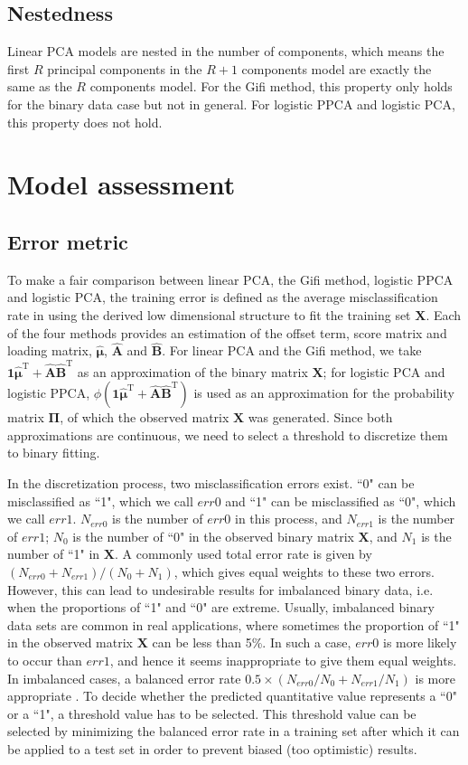 \subsection{Nestedness}
Linear PCA models are nested in the number of components, which means the first $R$ principal components in the $R+1$ components model are exactly the same as the $R$ components model. For the Gifi method, this property only holds for the binary data case but not in general. For logistic PPCA and logistic PCA, this property does not hold.

\section{Model assessment}

\subsection{Error metric}
To make a fair comparison between linear PCA, the Gifi method, logistic PPCA and logistic PCA, the training error is defined as the average misclassification rate in using the derived low dimensional structure to fit the training set $\mathbf{X}$. Each of the four methods provides an estimation of the offset term, score matrix and loading matrix, $\bm{\hat{\mu}}$, $\mathbf{\hat{A}}$ and $\mathbf{\hat{B}}$. For linear PCA and the Gifi method, we take $\mathbf{1}\bm{\hat{\mu}}^{\text{T}} + \mathbf{\hat{A}}\mathbf{\hat{B}}^{\text{T}}$ as an approximation of the binary matrix $\mathbf{X}$; for logistic PCA and logistic PPCA, $\phi(\mathbf{1}\bm{\hat{\mu}}^{\text{T}} + \mathbf{\hat{A}}\mathbf{\hat{B}}^{\text{T}})$ is used as an approximation for the probability matrix $\mathbf{\Pi}$, of which the observed matrix $\mathbf{X}$ was generated. Since both approximations are continuous, we need to select a threshold to discretize them to binary fitting.

In the discretization process, two misclassification errors exist. ``0" can be misclassified as ``1", which we call $err0$ and ``1" can be misclassified as ``0", which we call $err1$. $N_{err0}$ is the number of $err0$ in this process, and $N_{err1}$ is the number of $err1$; $N_0$ is the number of ``0" in the observed binary matrix $\mathbf{X}$, and $N_1$ is the number of ``1" in $\mathbf{X}$. A commonly used total error rate is given by $(N_{err0} + N_{err1})/(N_0 + N_1)$, which gives equal weights to these two errors. However, this can lead to undesirable results for imbalanced binary data, i.e. when the proportions of ``1" and ``0" are extreme. Usually, imbalanced binary data sets are common in real applications, where sometimes the proportion of ``1" in the observed matrix $\mathbf{X}$ can be less than 5\%. In such a case, $err0$ is more likely to occur than $err1$, and hence it seems inappropriate to give them equal weights. In imbalanced cases, a balanced error rate $0.5\times(N_{err0}/N_0 + N_{err1}/N_1)$ is more appropriate \cite{wei2013role}. To decide whether the predicted quantitative value represents a ``0" or a ``1", a threshold value has to be selected. This threshold value can be selected by minimizing the balanced error rate in a training set after which it can be applied to a test set in order to prevent biased (too optimistic) results.

